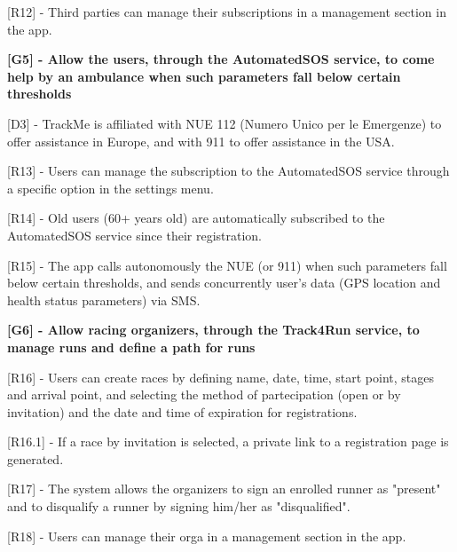 [R12] - Third parties can manage their subscriptions in a management section in the app. \newline

\hspace{-\parindent}\textbf{[G5] - Allow the users, through the AutomatedSOS service, to come help by an ambulance when such parameters fall below certain thresholds} \newline

[D3] - TrackMe is affiliated with NUE 112 (Numero Unico per le Emergenze) to offer assistance in Europe, and with 911 to offer assistance in the USA. \newline

[R13] - Users can manage the subscription to the AutomatedSOS service through a specific option in the settings menu. \newline

[R14] - Old users (60+ years old) are automatically subscribed to the AutomatedSOS service since their registration. \newline

[R15] - The app calls autonomously the NUE (or 911) when such parameters fall below certain thresholds, and sends concurrently user's data (GPS location and health status parameters) via SMS. \newline

\hspace{-\parindent}\textbf{[G6] - Allow racing organizers, through the Track4Run service, to manage runs and define a path for runs} \newline

[R16] - Users can create races by defining name, date, time, start point, stages and arrival point, and selecting the method of partecipation (open or by invitation) and the date and time of expiration for registrations. \newline

\hspace{\parindent}[R16.1] - If a race by invitation is selected, a private link to a registration page is generated. \newline

[R17] - The system allows the organizers to sign an enrolled runner as "present" and to disqualify a runner by signing him/her as "disqualified". \newline

[R18] - Users can manage their orga in a management section in the app. \newline

